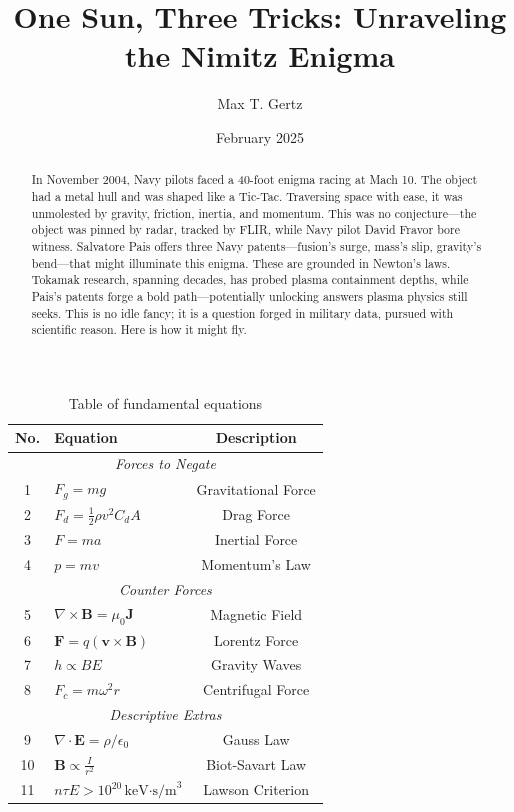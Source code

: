 \documentclass[11pt]{article}
\title{One Sun, Three Tricks: Unraveling the Nimitz Enigma}
\author{Max T. Gertz}
\date{February 2025}
\begin{document}
	
	\maketitle
	
	\begin{abstract}
		In November 2004, Navy pilots faced a 40-foot enigma racing at Mach 10. The object had a metal hull and was shaped like a Tic-Tac. Traversing space with ease, it was unmolested by gravity, friction, inertia, and momentum. This was no conjecture—the object was pinned by radar, tracked by FLIR, while Navy pilot David Fravor bore witness. Salvatore Pais offers three Navy patents—fusion’s surge, mass’s slip, gravity’s bend—that might illuminate this enigma. These are grounded in Newton’s laws. Tokamak research, spanning decades, has probed plasma containment depths, while Pais’s patents forge a bold path—potentially unlocking answers plasma physics still seeks. This is no idle fancy; it is a question forged in military data, pursued with scientific reason. Here is how it might fly.
	\end{abstract}
	
	\begin{table}[h]
		\centering
		\small
		\begin{tabular}{|c|l|c|}
			\hline
			\textbf{No.} & \textbf{Equation} & \textbf{Description} \\
			\hline
			\multicolumn{3}{|c|}{\textit{Forces to Negate}} \\
			\hline
			1 & \(F_g = mg\) \cite{newton1687} & Gravitational Force \\
			\hline
			2 & \(F_d = \frac{1}{2} \rho v^2 C_d A\) \cite{bernoulli1738} & Drag Force \\
			\hline
			3 & \(F = ma\) \cite{newton1687} & Inertial Force \\
			\hline
			4 & \(p = mv\) \cite{newton1687} & Momentum's Law \\
			\hline
			\multicolumn{3}{|c|}{\textit{Counter Forces}} \\
			\hline
			5 & \(\nabla \times \mathbf{B} = \mu_0 \mathbf{J}\) \cite{maxwell1865} & Magnetic Field \\
			\hline
			6 & \(\mathbf{F} = q(\mathbf{v} \times \mathbf{B})\) \cite{lorentz1895} & Lorentz Force \\
			\hline
			7 & \(h \propto B E\) \cite{gertsenshtein1962} & Gravity Waves \\
			\hline
			8 & \(F_c = m \omega^2 r\) \cite{newton1687} & Centrifugal Force \\
			\hline
			\multicolumn{3}{|c|}{\textit{Descriptive Extras}} \\
			\hline
			9 & \(\nabla \cdot \mathbf{E} = \rho/\epsilon_0\) \cite{maxwell1865} & Gauss Law \\
			\hline
			10 & \(\mathbf{B} \propto \frac{I}{r^2}\) \cite{biot1820} & Biot-Savart Law \\
			\hline
			11 & \(n \tau E > 10^{20} \, \text{keV·s/m}^3\) \cite{lawson1957} & Lawson Criterion \\
			\hline
		\end{tabular}
		\caption{Table of fundamental equations}
		\label{fig:eqtable}
	\end{table}
	
\end{document}
